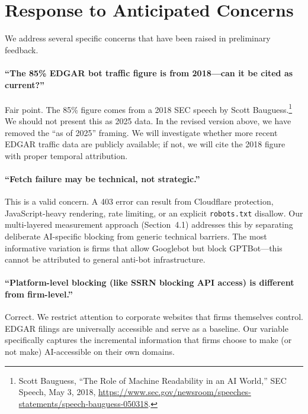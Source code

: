 \documentclass[12pt,a4paper]{article}
\begin{document}
\section{Response to Anticipated Concerns}
\label{sec:response}

We address several specific concerns that have been raised in preliminary feedback.

\paragraph{``The 85\% EDGAR bot traffic figure is from 2018---can it be cited as current?''} Fair point. The 85\% figure comes from a 2018 SEC speech by Scott Bauguess.\footnote{Scott Bauguess, ``The Role of Machine Readability in an AI World,'' SEC Speech, May 3, 2018, \url{https://www.sec.gov/newsroom/speeches-statements/speech-bauguess-050318}.} We should not present this as 2025 data. In the revised version above, we have removed the ``as of 2025'' framing. We will investigate whether more recent EDGAR traffic data are publicly available; if not, we will cite the 2018 figure with proper temporal attribution.

\paragraph{``Fetch failure may be technical, not strategic.''} This is a valid concern. A 403 error can result from Cloudflare protection, JavaScript-heavy rendering, rate limiting, or an explicit \texttt{robots.txt} disallow. Our multi-layered measurement approach (Section~4.1) addresses this by separating deliberate AI-specific blocking from generic technical barriers. The most informative variation is firms that allow Googlebot but block GPTBot---this cannot be attributed to general anti-bot infrastructure.

\paragraph{``Platform-level blocking (like SSRN blocking API access) is different from firm-level.''} Correct. We restrict attention to corporate websites that firms themselves control. EDGAR filings are universally accessible and serve as a baseline. Our variable specifically captures the incremental information that firms choose to make (or not make) AI-accessible on their own domains.
\end{document}

